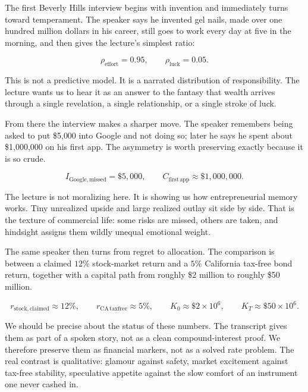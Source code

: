 The first Beverly Hills interview begins with invention and immediately turns toward temperament. The speaker says he invented gel nails, made over one hundred million dollars in his career, still goes to work every day at five in the morning, and then gives the lecture's simplest ratio:

\begin{equation}
\rho_{\mathrm{effort}} = 0.95,
\qquad
\rho_{\mathrm{luck}} = 0.05.
\end{equation}

This is not a predictive model. It is a narrated distribution of responsibility. The lecture wants us to hear it as an answer to the fantasy that wealth arrives through a single revelation, a single relationship, or a single stroke of luck.

From there the interview makes a sharper move. The speaker remembers being asked to put \$5{,}000 into Google and not doing so; later he says he spent about \$1{,}000{,}000 on his first app. The asymmetry is worth preserving exactly because it is so crude.

\begin{equation}
I_{\mathrm{Google,missed}} = \$5{,}000,
\qquad
C_{\mathrm{first\,app}} \approx \$1{,}000{,}000.
\end{equation}

The lecture is not moralizing here. It is showing us how entrepreneurial memory works. Tiny unrealized upside and large realized outlay sit side by side. That is the texture of commercial life: some risks are missed, others are taken, and hindsight assigns them wildly unequal emotional weight.

The same speaker then turns from regret to allocation. The comparison is between a claimed \(12\%\) stock-market return and a \(5\%\) California tax-free bond return, together with a capital path from roughly \$2 million to roughly \$50 million.

\begin{equation}
r_{\mathrm{stock,claimed}} \approx 12\%,
\qquad
r_{\mathrm{CA\,taxfree}} \approx 5\%,
\qquad
K_0 \approx \$2\times 10^6,
\qquad
K_T \approx \$50\times 10^6.
\end{equation}

We should be precise about the status of these numbers. The transcript gives them as part of a spoken story, not as a clean compound-interest proof. We therefore preserve them as financial markers, not as a solved rate problem. The real contrast is qualitative: glamour against safety, market excitement against tax-free stability, speculative appetite against the slow comfort of an instrument one never cashed in.

